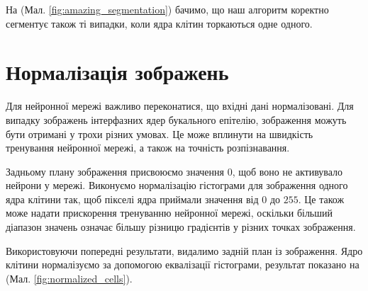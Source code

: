 \bigskip
На (Мал. \ref{fig:amazing_segmentation}) бачимо, що наш алгоритм коректно сегментує також ті випадки, коли ядра клітин торкаються одне одного.



\section{Нормалізація зображень}

Для нейронної мережі важливо переконатися, що вхідні дані нормалізовані. Для випадку зображень інтерфазних ядер букального епітелію, зображення можуть бути отримані у трохи різних умовах. Це може вплинути на швидкість тренування нейронної мережі, а також на точність розпізнавання.

Задньому плану зображення присвоюємо значення \(0\), щоб воно не активувало нейрони у мережі. Виконуємо нормалізацію гістограми для зображення одного ядра клітини так, щоб пікселі ядра приймали значення від \(0\) до \(255\). Це також може надати прискорення тренуванню нейронної мережі, оскільки більший діапазон значень означає більшу різницю градієнтів у різних точках зображення.

Використовуючи попередні результати, видалимо задній план із зображення. Ядро клітини нормалізуємо за допомогою еквалізації гістограми, результат показано на  (Мал. \ref{fig:normalized_cells}).


